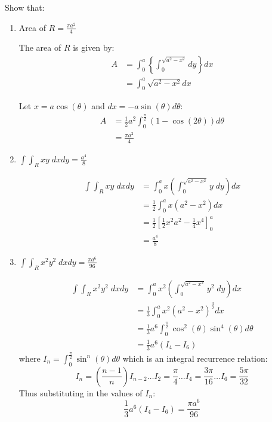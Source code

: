 \documentclass[10pt,a4paper]{article}
\begin{document}
Show that:
\begin{enumerate}
    \item Area of $R = \frac{\pi a^2}{4}$
    
    The area of $R$ is given by:
    \begin{align*}
        A &= \int_0^a \left\{\int_0^{\sqrt{a^2-x^2}}dy\right\}dx \\
        &= \int_0^a \sqrt{a^2-x^2}dx
    \end{align*}

    Let $x=a\cos(\theta)$ and $dx=-a\sin(\theta) d\theta$:
    \begin{align*}
        A &= \frac{1}{2}a^2 \int_0^{\frac{\pi}{2}}(1-\cos(2\theta))d\theta \\
        &= \frac{\pi a^2}{4}
    \end{align*}

    \item $\int \int_R xy \; dxdy = \frac{a^4}{8}$
    
    \begin{align*}
        \int \int_R xy \; dxdy &= \int_0^a x \left(\int_0^{\sqrt{a^2-x^2}}y \; dy\right)dx \\
        &= \frac{1}{2}\int_0^a x(a^2 - x^2) dx \\
        &= \frac{1}{2}[\frac{1}{2}x^2a^2 - \frac{1}{4}x^4]_0^a \\
        &= \frac{a^4}{8} 
    \end{align*}

    \item $\int \int_R x^2y^2 \; dxdy = \frac{\pi a^6}{96}$
    
    \begin{align*}
        \int \int_R x^2y^2 \; dxdy &= \int_0^a x^2 \left(\int_0^{\sqrt{a^2-x^2}}y^2 \; dy\right) dx \\
        &= \frac{1}{3} \int_0^a x^2(a^2-x^2)^{\frac{3}{2}} dx \\
        &= \frac{1}{3} a^6 \int_0^{\frac{\pi}{2}} \cos^2(\theta)\sin^4(\theta) d\theta \\
        &= \frac{1}{3}a^6(I_4 - I_6)
    \end{align*}
    where $I_n = \int_0^{\frac{\pi}{2}}\sin^n(\theta)d\theta$ which is an integral recurrence
    relation:
    $$
        I_n=\left(\frac{n-1}{n}\right)I_{n-2} \dots I_2 = \frac{\pi}{4} \dots I_4 = \frac{3\pi}{16} \dots I_6 = \frac{5\pi}{32}
    $$
    Thus substituting in the values of $I_n$:
    $$
        \frac{1}{3}a^6(I_4 - I_6) = \frac{\pi a^6}{96}
    $$
\end{enumerate}
\end{document}
